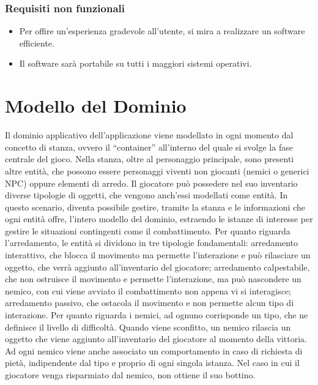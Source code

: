 \documentclass[a4paper,12pt]{report}
\begin{document}
\subsubsection{Requisiti non funzionali}
\begin{itemize}
	\item Per offire un'esperienza gradevole all'utente, si mira a realizzare un software efficiente.
	\item Il software sarà portabile su tutti i maggiori sistemi operativi.
\end{itemize}


\section{Modello del Dominio}

Il dominio applicativo dell’applicazione viene modellato in ogni momento dal concetto di stanza, ovvero il “container” all’interno del quale si svolge la fase centrale del gioco. Nella stanza, oltre al personaggio principale, sono presenti altre entità, che possono essere personaggi viventi non giocanti (nemici o generici NPC) oppure elementi di arredo. Il giocatore può possedere nel suo inventario diverse tipologie di oggetti, che vengono anch’essi modellati come entità. In questo scenario, diventa possibile gestire, tramite la stanza e le informazioni che ogni entità offre, l’intero modello del dominio, estraendo le istanze di interesse per gestire le situazioni contingenti come il combattimento. 
%
\newline Per quanto riguarda l’arredamento, le entità si dividono in tre tipologie fondamentali: arredamento interattivo, che blocca il movimento ma permette l'interazione e può rilasciare un oggetto, che verrà aggiunto all’inventario del giocatore; arredamento calpestabile, che non ostruisce il movimento e permette l'interazione, ma può nascondere un nemico, con cui viene avviato il combattimento non appena vi si interagisce; arredamento passivo, che ostacola il movimento e non permette alcun tipo di interazione. 
%
\newline Per quanto riguarda i nemici, ad ognuno corrisponde un tipo, che ne definisce il livello di difficoltà. Quando viene sconfitto, un nemico rilascia un oggetto che viene aggiunto all’inventario del giocatore al momento della vittoria. Ad ogni nemico viene anche associato un comportamento in caso di richiesta di pietà, indipendente dal tipo e proprio di ogni singola istanza. Nel caso in cui il giocatore venga risparmiato dal nemico, non ottiene il suo bottino.
\end{document}
